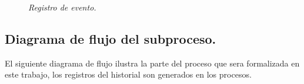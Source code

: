 \documentclass[12pt,a4paper,zed]{article}
\begin{document}
\begin{figure}[h]
\centering
{}
\caption{\textit{Registro de evento.}} \label{fig:M1}
\end{figure}

\subsection{Diagrama de flujo del subproceso.}
El siguiente diagrama de flujo ilustra la parte del proceso que sera formalizada en este trabajo, los registros del historial son generados en los procesos.
\end{document}
